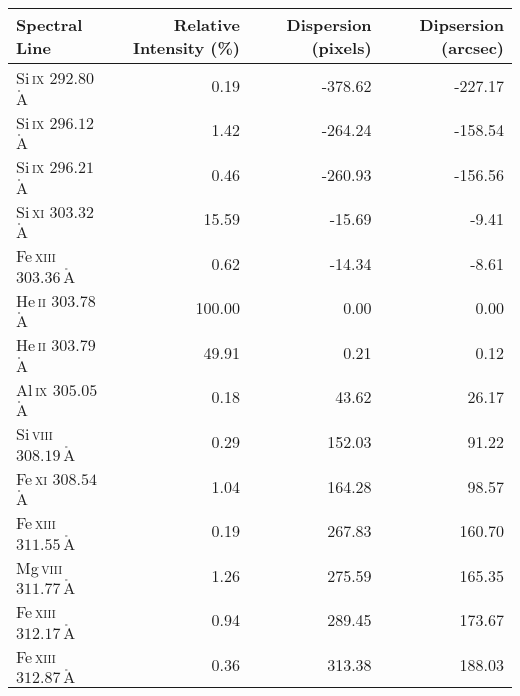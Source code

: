 \begin{tabular}{l|r|r|r}
\toprule
                                       Spectral Line &  Relative Intensity (\%) &  Dispersion (pixels) &  Dipsersion (arcsec) \\
\midrule
   Si\,\textsc{ix} $292.80\,$$\mathrm{\mathring{A}}$ &                     0.19 &              -378.62 &              -227.17 \\
   Si\,\textsc{ix} $296.12\,$$\mathrm{\mathring{A}}$ &                     1.42 &              -264.24 &              -158.54 \\
   Si\,\textsc{ix} $296.21\,$$\mathrm{\mathring{A}}$ &                     0.46 &              -260.93 &              -156.56 \\
   Si\,\textsc{xi} $303.32\,$$\mathrm{\mathring{A}}$ &                    15.59 &               -15.69 &                -9.41 \\
 Fe\,\textsc{xiii} $303.36\,$$\mathrm{\mathring{A}}$ &                     0.62 &               -14.34 &                -8.61 \\
   He\,\textsc{ii} $303.78\,$$\mathrm{\mathring{A}}$ &                   100.00 &                 0.00 &                 0.00 \\
   He\,\textsc{ii} $303.79\,$$\mathrm{\mathring{A}}$ &                    49.91 &                 0.21 &                 0.12 \\
   Al\,\textsc{ix} $305.05\,$$\mathrm{\mathring{A}}$ &                     0.18 &                43.62 &                26.17 \\
 Si\,\textsc{viii} $308.19\,$$\mathrm{\mathring{A}}$ &                     0.29 &               152.03 &                91.22 \\
   Fe\,\textsc{xi} $308.54\,$$\mathrm{\mathring{A}}$ &                     1.04 &               164.28 &                98.57 \\
 Fe\,\textsc{xiii} $311.55\,$$\mathrm{\mathring{A}}$ &                     0.19 &               267.83 &               160.70 \\
 Mg\,\textsc{viii} $311.77\,$$\mathrm{\mathring{A}}$ &                     1.26 &               275.59 &               165.35 \\
 Fe\,\textsc{xiii} $312.17\,$$\mathrm{\mathring{A}}$ &                     0.94 &               289.45 &               173.67 \\
 Fe\,\textsc{xiii} $312.87\,$$\mathrm{\mathring{A}}$ &                     0.36 &               313.38 &               188.03 \\

\end{tabular}
